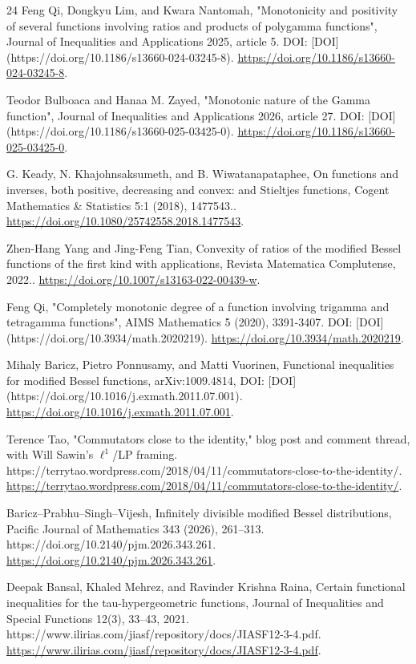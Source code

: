 \documentclass[11pt]{article}
\numberwithin{equation}{section}
\theoremstyle{definition}
\theoremstyle{remark}
\newcommand{\1}{\mathbf 1}
\begin{document}
\begin{thebibliography}{24}
Feng Qi, Dongkyu Lim, and Kwara Nantomah, "Monotonicity and positivity of several functions involving ratios and products of polygamma functions", Journal of Inequalities and Applications 2025, article 5. DOI: [DOI](https://doi.org/10.1186/s13660-024-03245-8).
\url{https://doi.org/10.1186/s13660-024-03245-8}.

Teodor Bulboaca and Hanaa M. Zayed, "Monotonic nature of the Gamma function", Journal of Inequalities and Applications 2026, article 27. DOI: [DOI](https://doi.org/10.1186/s13660-025-03425-0).
\url{https://doi.org/10.1186/s13660-025-03425-0}.

G. Keady, N. Khajohnsaksumeth, and B. Wiwatanapataphee, On functions and inverses, both positive, decreasing and convex: and Stieltjes functions, Cogent Mathematics \& Statistics 5:1 (2018), 1477543..
\url{https://doi.org/10.1080/25742558.2018.1477543}.

Zhen-Hang Yang and Jing-Feng Tian, Convexity of ratios of the modified Bessel functions of the first kind with applications, Revista Matematica Complutense, 2022..
\url{https://doi.org/10.1007/s13163-022-00439-w}.

Feng Qi, "Completely monotonic degree of a function involving trigamma and tetragamma functions", AIMS Mathematics 5 (2020), 3391-3407. DOI: [DOI](https://doi.org/10.3934/math.2020219).
\url{https://doi.org/10.3934/math.2020219}.

Mihaly Baricz, Pietro Ponnusamy, and Matti Vuorinen, Functional inequalities for modified Bessel functions, arXiv:1009.4814, DOI: [DOI](https://doi.org/10.1016/j.exmath.2011.07.001).
\url{https://doi.org/10.1016/j.exmath.2011.07.001}.

Terence Tao, "Commutators close to the identity," blog post and comment thread, with Will Sawin's \(\ell^1\)/LP framing. https://terrytao.wordpress.com/2018/04/11/commutators-close-to-the-identity/.
\url{https://terrytao.wordpress.com/2018/04/11/commutators-close-to-the-identity/}.

Baricz--Prabhu--Singh--Vijesh, Infinitely divisible modified Bessel distributions, Pacific Journal of Mathematics 343 (2026), 261--313. https://doi.org/10.2140/pjm.2026.343.261.
\url{https://doi.org/10.2140/pjm.2026.343.261}.

Deepak Bansal, Khaled Mehrez, and Ravinder Krishna Raina, Certain functional inequalities for the tau-hypergeometric functions, Journal of Inequalities and Special Functions 12(3), 33--43, 2021. https://www.ilirias.com/jiasf/repository/docs/JIASF12-3-4.pdf.
\url{https://www.ilirias.com/jiasf/repository/docs/JIASF12-3-4.pdf}.


\end{thebibliography}
\end{document}
